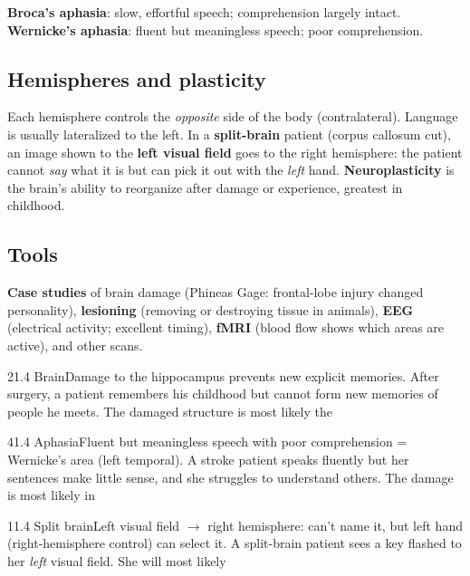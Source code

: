 \documentclass[11pt]{article}
\begin{document}
\textbf{Broca's aphasia}: slow, effortful speech; comprehension largely intact. \textbf{Wernicke's aphasia}: fluent but meaningless speech; poor comprehension.

\subsection{Hemispheres and plasticity}
Each hemisphere controls the \emph{opposite} side of the body (contralateral). Language is usually lateralized to the left. In a \textbf{split-brain} patient (corpus callosum cut), an image shown to the \textbf{left visual field} goes to the right hemisphere: the patient cannot \emph{say} what it is but can pick it out with the \emph{left} hand. \textbf{Neuroplasticity} is the brain's ability to reorganize after damage or experience, greatest in childhood.

\subsection{Tools}
\textbf{Case studies} of brain damage (Phineas Gage: frontal-lobe injury changed personality), \textbf{lesioning} (removing or destroying tissue in animals), \textbf{EEG} (electrical activity; excellent timing), \textbf{fMRI} (blood flow shows which areas are active), and other scans.

\begin{q}{2}{1.4 Brain}{Damage to the hippocampus prevents new explicit memories.}
After surgery, a patient remembers his childhood but cannot form new memories of people he meets. The damaged structure is most likely the
\end{q}

\begin{q}{4}{1.4 Aphasia}{Fluent but meaningless speech with poor comprehension = Wernicke's area (left temporal).}
A stroke patient speaks fluently but her sentences make little sense, and she struggles to understand others. The damage is most likely in
\end{q}

\begin{q}{1}{1.4 Split brain}{Left visual field \(\rightarrow\) right hemisphere: can't name it, but left hand (right-hemisphere control) can select it.}
A split-brain patient sees a key flashed to her \emph{left} visual field. She will most likely
\end{q}
\end{document}
